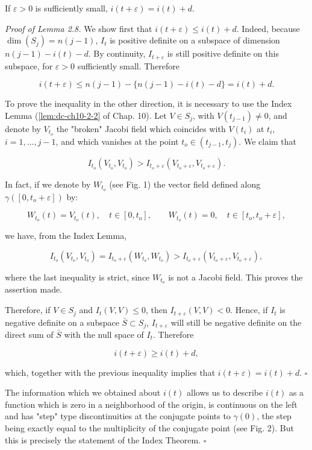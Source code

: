 \begin{lemma}
  \label{lem:dc-ch11-2-8}
  If $\varepsilon>0$ is sufficiently small, $i(t+\varepsilon)=i(t)+d$.
  
  \emph{Proof of Lemma 2.8.} We show first that $i(t+\varepsilon)\leq i(t)+d$. Indeed,
  because $\dim(S_j)=n(j-1)$, $I_t$ is positive definite on a subspace of dimension
  $n(j-1)-i(t)-d$. By continuity, $I_{t+\varepsilon}$ is still positive definite on
  this subspace, for $\varepsilon>0$ sufficiently small. Therefore
  
  $$
  i(t+\varepsilon)\leq n(j-1)-\{n(j-1)-i(t)-d\}=i(t)+d.
  $$
  
  To prove the inequality in the other direction, it is necessary to use the Index
  Lemma (\cref{lem:dc-ch10-2-2} of Chap. 10). Let $V\in S_j$, with $V(t_{j-1})\neq 0$, and
  denote by $V_{t_o}$ the "broken" Jacobi field which coincides with $V(t_i)$ at
  $t_i$, $i=1,\dots,j-1$, and which vanishes at the point $t_o\in(t_{j-1},t_j)$. We
  claim that
  
  $$
  I_{t_o}(V_{t_o},V_{t_o})>I_{t_o+\varepsilon}(V_{t_o+\varepsilon},V_{t_o+\varepsilon}).
  $$
  
  In fact, if we denote by $W_{t_o}$ (see Fig. 1) the vector field defined along
  $\gamma([0,t_o+\varepsilon])$ by:
  
  $$
  W_{t_o}(t)=V_{t_o}(t),\quad t\in[0,t_o],\qquad W_{t_o}(t)=0,\quad t\in[t_o,t_o+\varepsilon],
  $$
  
  we have, from the Index Lemma,
  
  $$
  I_{t_o}(V_{t_o},V_{t_o})=I_{t_o+\varepsilon}(W_{t_o},W_{t_o})>I_{t_o+\varepsilon}(V_{t_o+\varepsilon},V_{t_o+\varepsilon}),
  $$
  
  where the last inequality is strict, since $W_{t_o}$ is not a Jacobi field. This
  proves the assertion made.
  
  Therefore, if $V\in S_j$ and $I_t(V,V)\leq 0$, then $I_{t+\varepsilon}(V,V)<0$.
  Hence, if $I_t$ is negative definite on a subspace $\bar S\subset S_j$,
  $I_{t+\varepsilon}$ will still be negative definite on the direct sum of $\bar S$
  with the null space of $I_t$. Therefore
  
  $$
  i(t+\varepsilon)\geq i(t)+d,
  $$
  
  which, together with the previous inequality implies that
  $i(t+\varepsilon)=i(t)+d$. $\square$
  
  The information which we obtained about $i(t)$ allows us to describe $i(t)$ as a
  function which is zero in a neighborhood of the origin, is continuous on the left
  and has "step" type discontinuities at the conjugate points to $\gamma(0)$, the
  step being exactly equal to the multiplicity of the conjugate point (see Fig. 2).
  But this is precisely the statement of the Index Theorem. $\square$
\end{lemma}

